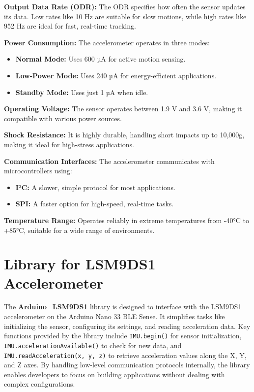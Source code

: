 	\textbf{Output Data Rate (ODR):} The ODR specifies how often the sensor updates its data. Low rates like 10 Hz are suitable for slow motions, while high rates like 952 Hz are ideal for fast, real-time tracking.
	
	\textbf{Power Consumption:} The accelerometer operates in three modes:
	\begin{itemize}
		\item \textbf{Normal Mode:} Uses 600 µA for active motion sensing.
		\item \textbf{Low-Power Mode:} Uses 240 µA for energy-efficient applications.
		\item \textbf{Standby Mode:} Uses just 1 µA when idle.
	\end{itemize}
	
	\textbf{Operating Voltage:} The sensor operates between 1.9 V and 3.6 V, making it compatible with various power sources.
	
	\textbf{Shock Resistance:} It is highly durable, handling short impacts up to 10,000g, making it ideal for high-stress applications.
	
	\textbf{Communication Interfaces:} The accelerometer communicates with microcontrollers using:
	\begin{itemize}
		\item \textbf{I²C:} A slower, simple protocol for most applications.
		\item \textbf{SPI:} A faster option for high-speed, real-time tasks.
	\end{itemize}
	
	\textbf{Temperature Range:} Operates reliably in extreme temperatures from -40°C to +85°C, suitable for a wide range of environments.\cite{STM:2015}
	
\section{Library for LSM9DS1 Accelerometer}

The \textbf{Arduino\_LSM9DS1} library is designed to interface with the LSM9DS1 accelerometer on the Arduino Nano 33 BLE Sense. It simplifies tasks like initializing the sensor, configuring its settings, and reading acceleration data. Key functions provided by the library include \texttt{IMU.begin()} for sensor initialization, \texttt{IMU.accelerationAvailable()} to check for new data, and \texttt{IMU.readAcceleration(x, y, z)} to retrieve acceleration values along the X, Y, and Z axes. By handling low-level communication protocols internally, the library enables developers to focus on building applications without dealing with complex configurations.

